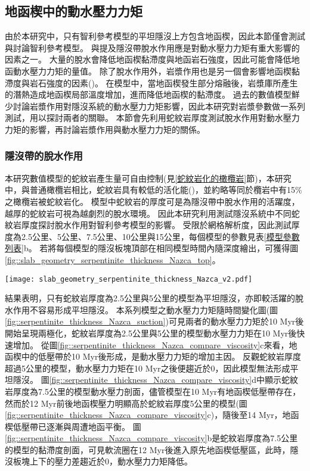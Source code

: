 \newpage
\subsection{地函楔中的動水壓力力矩}
由於本研究中，只有智利參考模型的平坦隱沒上方包含地函楔，因此本節僅會測試與討論智利參考模型。
\citealp{Manea2007}與\citealp{Yan2020}提及隱沒帶脫水作用應是對動水壓力力矩有重大影響的因素之一。
大量的脫水會降低地函楔黏滯度與地函岩石強度，因此可能會降低地函動水壓力力矩的量值。
除了脫水作用外，岩漿作用也是另一個會影響地函楔黏滯度與岩石強度的因素(\citealp{jamieson2011crustal})。
在模型中，當地函楔發生部分熔融後，岩漿庫所產生的潛熱造成地函楔局部溫度增加，進而降低地函楔的黏滯度。
過去的數值模型鮮少討論岩漿作用對隱沒系統的動水壓力力矩影響，因此本研究對岩漿參數做一系列測試，用以探討兩者的關聯。
本節會先利用蛇紋岩厚度測試脫水作用對動水壓力力矩的影響，再討論岩漿作用與動水壓力力矩的關係。

\subsubsection{隱沒帶的脫水作用}
本研究數值模型的蛇紋岩產生量可自由控制(見\ref{蛇紋岩化的橄欖岩}節)，本研究中，與普通橄欖岩相比，蛇紋岩具有較低的活化能(\citealp{hilairet2007high})，並約略等同於欖岩中有15$\%$之橄欖岩被蛇紋岩化。
模型中蛇紋岩的厚度可是為隱沒帶中脫水作用的活躍度，越厚的蛇紋岩可視為越劇烈的脫水環境。
因此本研究利用測試隱沒系統中不同蛇紋岩厚度探討脫水作用對智利參考模型的影響。
受限於網格解析度，因此測試厚度為2.5公里、5公里、7.5公里、10公里與15公里，每個模型的參數見表\ref{模型參數列表}b。
若將每個模型的隱沒板塊頂部在相同模型時間內隨深度繪出，可獲得圖\ref{fig::slab_geometry_serpentinite_thickness_Nazca_top}。

\begin{figure*}[ht!]
    \centering
    \texttt{[image: slab\_geometry\_serpentinite\_thickness\_Nazca\_v2.pdf]}
    \caption[測試蛇紋岩厚度模型的隱沒板塊頂部剖面圖]{測試蛇紋岩厚度模型的隱沒板塊頂部剖面圖，使用5公里移動平均平滑離散化的網格。}
    \label{fig::slab_geometry_serpentinite_thickness_Nazca_top}
\end{figure*}

結果表明，只有蛇紋岩厚度為2.5公里與5公里的模型為平坦隱沒，亦即較活躍的脫水作用不容易形成平坦隱沒。
本系列模型之動水壓力力矩隨時間變化圖(圖\ref{fig::serpentinite_thickness_Nazca_suction})可見兩者的動水壓力力矩於10 Myr後開始呈現兩極化，蛇紋岩厚度為2.5公里與5公里的模型動水壓力力矩在10 Myr後快速增加。
從圖\ref{fig::serpentinite_thickness_Nazca_compare_viscosity}c來看，地函楔中的低壓帶於10 Myr後形成，是動水壓力力矩的增加主因。
反觀蛇紋岩厚度超過5公里的模型，動水壓力力矩在10 Myr之後便趨近於0，因此模型無法形成平坦隱沒。
圖\ref{fig::serpentinite_thickness_Nazca_compare_viscosity}d中顯示蛇紋岩厚度為7.5公里的模型動水壓力剖面，儘管模型在10 Myr有地函楔低壓帶存在，然而於12 Myr前後地函楔壓力明顯高於蛇紋岩厚度5公里的模型(圖\ref{fig::serpentinite_thickness_Nazca_compare_viscosity}c)，隨後至14 Myr，地函楔低壓帶已逐漸與周遭地函平衡。
圖\ref{fig::serpentinite_thickness_Nazca_compare_viscosity}b是蛇紋岩厚度為7.5公里的模型的黏滯度剖面，可見軟流圈在12 Myr後進入原先地函楔低壓區，此時，隱沒板塊上下的壓力差趨近於0，動水壓力力矩降低。

